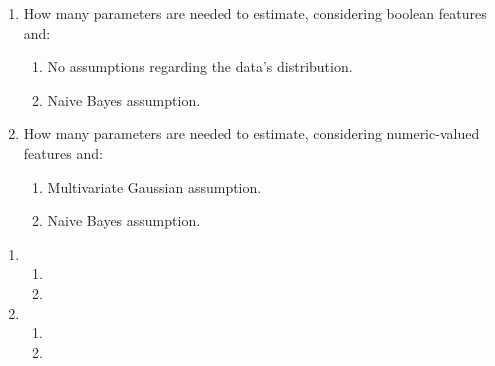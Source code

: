 \documentclass[12pt]{article}
\begin{document}
\begin{enumerate}[leftmargin=\labelsep]
{        \begin{enumerate}
          \item How many parameters are needed to estimate, considering boolean features and:
                \begin{enumerate}
                  \item No assumptions regarding the data's distribution.
                  \item Naive Bayes assumption.
                \end{enumerate}
          \item How many parameters are needed to estimate, considering numeric-valued features and:
                \begin{enumerate}
                  \item Multivariate Gaussian assumption.
                  \item Naive Bayes assumption.
                \end{enumerate}
        \end{enumerate}
        }

        \begin{enumerate}
          \item {
                \begin{enumerate}
                  \item {}
                  \item {}
                \end{enumerate}
                }
          \item {
                \begin{enumerate}
                  \item {}
                  \item {}
                \end{enumerate}
                }
        \end{enumerate}

\end{enumerate}
\end{document}
